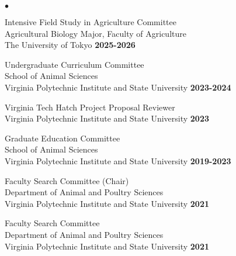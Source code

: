 \documentclass[margin,line,10pt]{res}
\newenvironment{list2}{
  \begin{list}{$\bullet$}{%
      \setlength{\itemsep}{0in}
      \setlength{\parsep}{0in} \setlength{\parskip}{0in}
      \setlength{\topsep}{0in} \setlength{\partopsep}{0in} 
      \setlength{\leftmargin}{0.2in}}}{\end{list}}
\begin{document}
\begin{resume}
\begin{list2}
  \item Intensive Field Study in Agriculture Committee  \\ %
  Agricultural Biology Major, Faculty of Agriculture  \\ The University of Tokyo   \hfill \textbf{2025-2026}\\

  \vspace{0.3cm}


  \item Undergraduate Curriculum Committee \\
  School of Animal Sciences \\ Virginia Polytechnic Institute and State University   \hfill \textbf{2023-2024}\\

  \vspace{0.3cm}

  \item  Virginia Tech Hatch Project Proposal Reviewer \\
  Virginia Polytechnic Institute and State University  \hfill \textbf{2023}  \\

  \vspace{0.3cm}


  \item Graduate Education Committee \\
  School of Animal Sciences \\ Virginia Polytechnic Institute and State University   \hfill \textbf{2019-2023}\\

  \vspace{0.3cm}

  \item Faculty Search Committee (Chair) \\
  Department of Animal and Poultry Sciences \\ Virginia Polytechnic Institute and State University   \hfill \textbf{2021}\\

  
  \vspace{0.3cm}

   \item  Faculty Search Committee \\
  Department of Animal and Poultry Sciences \\ Virginia Polytechnic Institute and State University   \hfill \textbf{2021}\\


\end{list2}
\end{resume}
\end{document}
